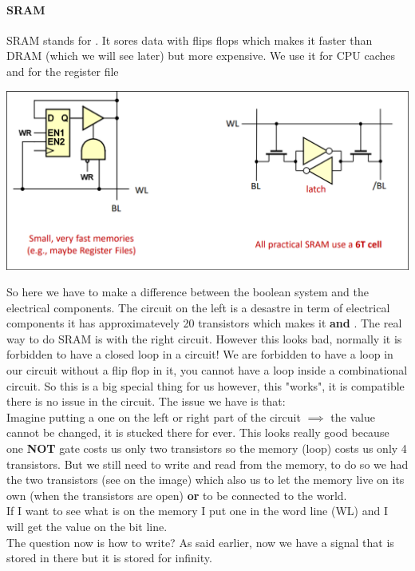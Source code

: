 \paragraph{SRAM}
SRAM stands for . It sores data with flips flops which makes it faster than DRAM (which we will see later) but more expensive. We use it for CPU caches and for the register file
\begin{center}
\includegraphics[scale=0.3]{screenshots/2025-10-11_10.png}
\end{center}
So here we have to make a difference between the boolean system and the electrical components. The circuit on the left is a desastre in term of electrical components it has approximatevely 20 transistors which makes it  \textbf{and} . The real way to do SRAM is with the right circuit. However this looks bad, normally it is forbidden to have a closed loop in a circuit! We are forbidden to have a loop in our circuit without a flip flop in it, you cannot have a loop inside a combinational circuit. So this is a big special thing for us however, this "works", it is compatible there is no issue in the circuit. The issue we have is that:\\
Imagine putting a one on the left or right part of the circuit $\implies$ the value cannot be changed, it is stucked there for ever. This looks really good because one \textbf{NOT} gate costs us only two transistors so the memory (loop) costs us only 4 transistors. But we still need to write and read from the memory, to do so we had the two transistors (see on the image) which also us to let the memory live on its own (when the transistors are open) \textbf{or} to be connected to the world. \\
If I want to see what is on the memory I put one in the word line (WL) and I will get the value on the bit line.\\
The question now is how to write? As said earlier, now we have a signal that is stored in there but it is stored for infinity.\\
